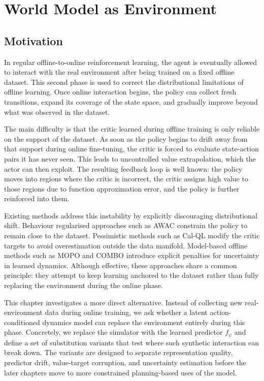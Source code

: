 \chapter{World Model as Environment}
\label{chap:wm-env}

\section{Motivation}
\label{sec:wmep-motivation}

In regular offline-to-online reinforcement learning, the agent
is eventually allowed to interact with the real environment after being trained on a
fixed offline dataset. This second phase is used to correct the distributional
limitations of offline learning. Once online interaction begins, the policy can
collect fresh transitions, expand its coverage of the state space, and gradually
improve beyond what was observed in the dataset.

The main difficulty is that the
critic learned during offline training is only reliable on the support of the dataset.
As soon as the policy begins to drift away from that support during online fine-tuning,
the critic is forced to evaluate state-action pairs it has never seen. This leads to
uncontrolled value extrapolation, which the actor can then exploit. The resulting
feedback loop is well known: the policy moves into regions where the critic is
incorrect, the critic assigns high value to those regions due to function approximation
error, and the policy is further reinforced into them.

Existing methods address this instability by explicitly discouraging distributional
shift. Behaviour regularised approaches such as AWAC\cite{nair2021awacacceleratingonlinereinforcement} constrain
the policy to remain close to the dataset. Pessimistic methods such as Cal-QL\cite{nakamoto2024calqlcalibratedofflinerl} modify the critic targets to avoid overestimation outside
the data manifold. Model-based offline methods such as MOPO and COMBO\cite{yu2020mopomodelbasedofflinepolicy, yu2021combo} introduce explicit penalties
for uncertainty in learned dynamics. Although effective, these approaches share a
common principle: they attempt to keep learning anchored to the dataset rather than
fully replacing the environment during the online phase.

This chapter investigates a more direct alternative. Instead of collecting new
real-environment data during online training, we ask whether a latent
action-conditioned dynamics model can replace the environment entirely during this
phase. Concretely, we replace the simulator with the learned predictor
$f_\psi$ and define a set of substitution variants that test where such synthetic
interaction can break down. The variants are designed to separate representation
quality, predictor drift, value-target corruption, and uncertainty estimation before
the later chapters move to more constrained planning-based uses of the model.

